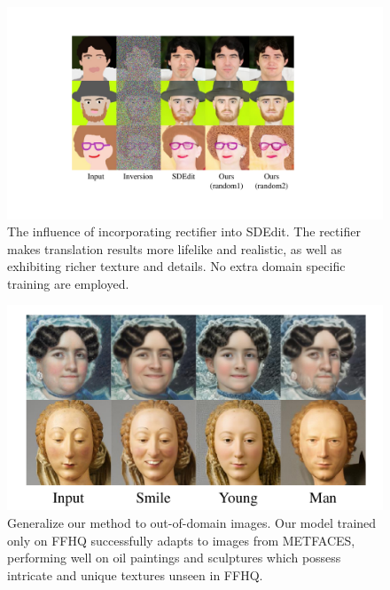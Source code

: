 \documentclass[letterpaper]{article} %
\begin{document}
\begin{figure}[t]
    \centering
    \includegraphics[width=1\columnwidth]{Figs/fig7.pdf}
    \caption{The influence of incorporating rectifier into SDEdit. The rectifier makes translation results  more lifelike and realistic, as well as exhibiting richer texture and details. No extra domain specific training are employed.}
    \label{fig7}
\end{figure}

\begin{figure}[t]
    \centering
    \includegraphics[width=1\columnwidth]{Figs/fig8.pdf}
    \caption{Generalize our method to out-of-domain images. Our model trained only on FFHQ successfully adapts to images from METFACES,  performing well on oil paintings and sculptures which possess intricate and unique textures unseen in FFHQ.}
    \label{fig8}
\end{figure}
\end{document}
